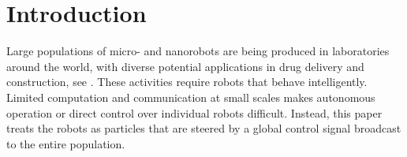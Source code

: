 \section{Introduction}\label{sec:Intro}


Large populations of micro- and nanorobots are being produced in laboratories around the world, with diverse potential applications in drug delivery and construction, see \cite{Peyer2013,Shirai2005,Chiang2011}. These activities require robots that behave intelligently.
Limited computation and communication at small scales makes autonomous operation or direct control over individual robots difficult. 
Instead, this paper treats the robots as particles that are steered by a global control signal broadcast to the entire population.    
